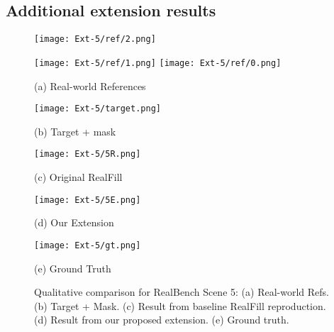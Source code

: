 \documentclass{article}
\begin{document}
\subsection{Additional extension results}
\label{appendix:additional_extension}

\begin{figure}[H]
    \centering
    \begin{minipage}[t]{0.19\textwidth}
        \centering
        \begin{minipage}[b]{0.48\textwidth}
            \centering
            \texttt{[image: Ext-5/ref/2.png]}
        \end{minipage}\hfill
        \begin{minipage}[b]{0.48\textwidth}
            \centering
            \texttt{[image: Ext-5/ref/1.png]}
            \texttt{[image: Ext-5/ref/0.png]}
        \end{minipage}
        \caption*{(a) Real-world References}
    \end{minipage}\hfill%
    \begin{minipage}[t]{0.19\textwidth}
        \centering
        \texttt{[image: Ext-5/target.png]}
        \caption*{(b) Target + mask}
    \end{minipage}\hfill%
    \begin{minipage}[t]{0.19\textwidth}
        \centering
        \texttt{[image: Ext-5/5R.png]}
        \caption*{(c) Original RealFill}
    \end{minipage}\hfill%
    \begin{minipage}[t]{0.19\textwidth}
        \centering
        \texttt{[image: Ext-5/5E.png]}
        \caption*{(d) Our Extension}
    \end{minipage}\hfill%
    \begin{minipage}[t]{0.19\textwidth}
        \centering
        \texttt{[image: Ext-5/gt.png]}
        \caption*{(e) Ground Truth}
    \end{minipage}
    \caption{Qualitative comparison for RealBench Scene 5: (a) Real-world Refs. (b) Target + Mask. (c) Result from baseline RealFill reproduction. (d) Result from our proposed extension. (e) Ground truth.}
\end{figure}
\end{document}
